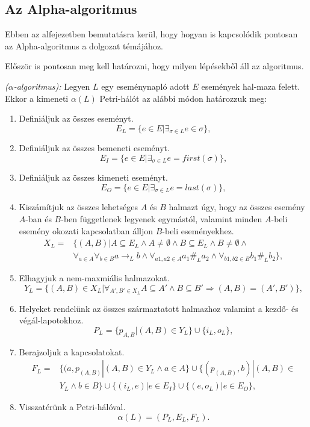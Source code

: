 \subsection{Az Alpha-algoritmus}

Ebben az alfejezetben bemutatásra kerül, hogy hogyan is kapcsolódik pontosan az Alpha-algoritmus a dolgozat témájához.

Először is pontosan meg kell határozni, hogy milyen lépésekből áll az algoritmus.

\begin{definition}{\textit{($\alpha$-algoritmus):}} Legyen $L$ egy eseménynapló adott $E$ események hal\hyp{}maza felett. Ekkor a kimeneti $\alpha (L)$ Petri-hálót az alábbi módon határozzuk meg:
\begin{enumerate}
	\item Definiáljuk az összes eseményt.\\
	\[
		E_L = \{ e \in E | \exists_{\sigma \in L} e \in \sigma \},
	\]
	\item Definiáljuk az összes bemeneti eseményt.
	\[
		E_I = \{ e \in E | \exists_{\sigma \in L} e = first(\sigma) \},
	\]
	\item Definiáljuk az összes kimeneti eseményt.
	\[
		E_O = \{ e \in E | \exists_{\sigma \in L} e = last(\sigma) \},	
	\]
	\item Kiszámítjuk az összes lehetséges $A$ és $B$ halmazt úgy, hogy az összes esemény $A$-ban és $B$-ben függetlenek legyenek egymástól, valamint minden $A$-beli esemény okozati kapcsolatban álljon $B$-beli eseményekhez.
	\begin{equation*}
	\begin{aligned}
		X_L=
		&\{ (A,B) | A \subseteq E_L \land A \neq \emptyset \land B \subseteq E_L \land B \neq \emptyset \land \\
		&\forall_{a \in A} \forall_{b \in B} a \rightarrow_L b \land \forall_{a1,a2 \in A} a_1\#_L a_2  \land \forall_{b1,b2 \in B} b_1\#_Lb_2\},
	\end{aligned}
	\end{equation*}
	\item Elhagyjuk a nem-maxmiális halmazokat.
	\[
		Y_L = \{ (A,B) \in X_L | \forall_{A',B' \in X_L} A \subseteq A' \land B \subseteq B' \Rightarrow (A,B) = (A',B') \},
	\]
	\item Helyeket rendelünk az összes származtatott halmazhoz valamint a kezdő- és végál\hyp{}lapotokhoz.
	\[
		P_L = \{ p_{A,B} | (A,B) \in Y_L\} \cup \{i_L,o_L\},		
	\]
	\item Berajzoljuk a kapcsolatokat.
	\begin{equation*}
	\begin{aligned}
		F_L=
		&\{(a,p_{(A,B)} | (A,B) \in Y_L \land a \in A \} \cup \{ (p_{(A,B)}, b) | (A,B) \in \\
		&Y_L \land b \in B \} \cup \{ (i_L,e) | e \in E_I \} \cup \{ (e,o_L) | e \in E_O\},
	\end{aligned}
	\end{equation*}
	\item Visszatérünk a Petri-hálóval.
	\[
		\alpha(L) = (P_L, E_L, F_L).
	\]


\end{enumerate}
\end{definition}
